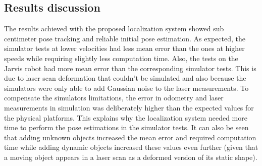 \subsection{Results discussion}

The results achieved with the proposed localization system showed sub centimeter pose tracking and reliable initial pose estimation. As expected, the simulator tests at lower velocities had less mean error than the ones at higher speeds while requiring slightly less computation time. Also, the tests on the Jarvis robot had more mean error than the corresponding simulator tests. This is due to laser scan deformation that couldn't be simulated and also because the simulators were only able to add Gaussian noise to the laser measurements. To compensate the simulators limitations, the error in odometry and laser measurements in simulation was deliberately higher than the expected values for the physical platforms. This explains why the localization system needed more time to perform the pose estimations in the simulator tests. It can also be seen that adding unknown objects increased the mean error and required computation time while adding dynamic objects increased these values even further (given that a moving object appears in a laser scan as a deformed version of its static shape).

